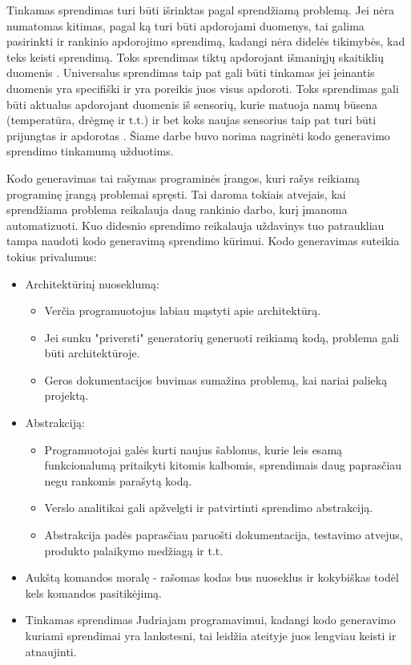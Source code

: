\documentclass{VUMIFPSbakalaurinis}
\begin{document}
Tinkamas sprendimas turi būti išrinktas pagal sprendžiamą problemą. Jei nėra numatomas kitimas, pagal ką turi būti apdorojami duomenys, tai galima pasirinkti ir rankinio apdorojimo sprendimą, kadangi nėra didelės tikimybės, kad teks keisti sprendimą. Toks sprendimas tiktų apdorojant išmaniųjų skaitiklių duomenis \cite{skaitikliai}. Universalus sprendimas taip pat gali būti tinkamas jei įeinantis duomenis yra specifiški ir yra poreikis juos visus apdoroti. Toks sprendimas gali būti aktualus apdorojant duomenis iš sensorių, kurie matuoja namų būsena (temperatūra, drėgmę ir t.t.) ir bet koks naujas sensorius taip pat turi būti prijungtas ir apdorotas \cite{yang2017iot}. Šiame darbe buvo norima nagrinėti kodo generavimo sprendimo tinkamumą užduotims. \par
Kodo generavimas tai rašymas programinės įrangos, kuri rašys reikiamą programinę įrangą problemai spręsti. Tai daroma tokiais atvejais, kai sprendžiama problema reikalauja daug rankinio darbo, kurį įmanoma automatizuoti. Kuo didesnio sprendimo reikalauja uždavinys tuo patraukliau tampa naudoti kodo generavimą sprendimo kūrimui. Kodo generavimas suteikia tokius privalumus: 
\begin{itemize}
    \item Architektūrinį nuoseklumą: 
    \begin{itemize}
        \item Verčia programuotojus labiau mąstyti apie architektūrą.
        \item Jei sunku "priversti" generatorių generuoti reikiamą kodą, problema gali būti architektūroje.
        \item Geros dokumentacijos buvimas sumažina problemą, kai nariai palieką projektą.
    \end{itemize}
    \item Abstrakciją:
    \begin{itemize}
        \item Programuotojai galės kurti naujus šablonus, kurie leis esamą funkcionalumą pritaikyti kitomis kalbomis, sprendimais daug paprasčiau negu rankomis parašytą kodą.
        \item Verslo analitikai gali apžvelgti ir patvirtinti sprendimo abstrakciją.
        \item Abstrakcija padės paprasčiau paruošti dokumentacija, testavimo atvejus, produkto palaikymo medžiagą ir t.t.  
    \end{itemize}
    \item Aukštą komandos moralę - rašomas kodas bus nuoseklus ir kokybiškas todėl kels komandos pasitikėjimą.
    \item Tinkamas sprendimas Judriajam programavimui, kadangi kodo generavimo kuriami sprendimai yra lankstesni, tai leidžia ateityje juos lengviau keisti ir atnaujinti.   
\end{itemize} 
\end{document}

